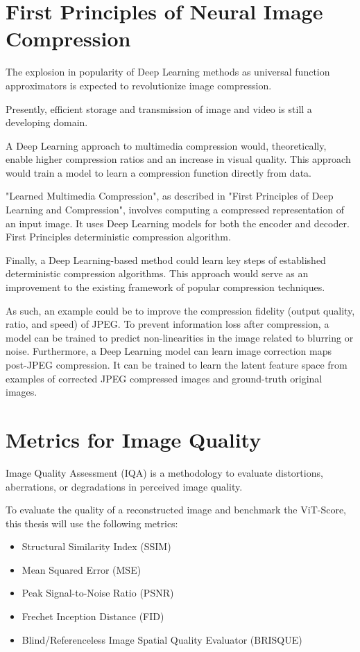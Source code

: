 \section{First Principles of Neural Image Compression}

The explosion in popularity of Deep Learning methods as universal function approximators
is expected to revolutionize image compression.

Presently, efficient storage and transmission of image and video is still a developing domain.

A Deep Learning approach to multimedia compression would, theoretically, enable higher compression ratios 
and an increase in visual quality. This approach would train a model to learn a compression function directly from data. 

"Learned Multimedia Compression", as described in "First Principles of Deep Learning and Compression", involves
computing a compressed representation of an input image. It uses Deep Learning models for both the encoder and decoder.
\citep{Principles}
First Principles deterministic compression algorithm. 

Finally, a Deep Learning-based method could learn key steps of established deterministic compression algorithms.
This approach would serve as an improvement to the existing framework of popular compression techniques.

As such, an example could be to improve the compression fidelity (output quality, ratio, and speed) of JPEG. 
To prevent information loss after compression, a model can be trained to predict non-linearities in the image related to blurring or noise.
Furthermore, a Deep Learning model can learn image correction maps post-JPEG compression. 
It can be trained to learn the latent feature space from examples of corrected JPEG compressed images and
ground-truth original images. 


\section{Metrics for Image Quality}

Image Quality Assessment (IQA) is a methodology to evaluate distortions, aberrations, or
degradations in perceived image quality.

To evaluate the quality of a reconstructed image and benchmark the ViT-Score,
this thesis will use the following metrics:

\begin{itemize}
	\item Structural Similarity Index (SSIM)
	\item Mean Squared Error (MSE)
    \item Peak Signal-to-Noise Ratio (PSNR)
	\item Frechet Inception Distance (FID)
	\item Blind/Referenceless Image Spatial Quality Evaluator (BRISQUE)
\end{itemize}

